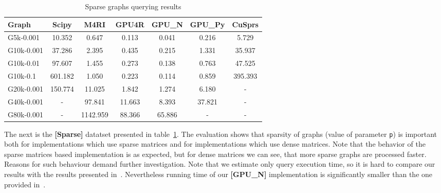 {\setlength{\tabcolsep}{0.25em}
\begin{table}[H]
\caption{Sparse graphs querying results}
\label{tbl:tableSparse}
\begin{tabular}{| l | c | c | c | c | c | c | }
    \hline
    Graph              & Scipy   & M4RI     & GPU4R  & GPU\_N & GPU\_Py & CuSprs  \\
    \hline
    \hline
    \small{G5k-0.001}  & 10.352  & 0.647    & 0.113  & 0.041  & 0.216   & 5.729   \\
    \small{G10k-0.001} & 37.286  & 2.395    & 0.435  & 0.215  & 1.331   & 35.937  \\
    \small{G10k-0.01}  & 97.607  & 1.455    & 0.273  & 0.138  & 0.763   & 47.525  \\
    \small{G10k-0.1}   & 601.182 & 1.050    & 0.223  & 0.114  & 0.859   & 395.393 \\
    \small{G20k-0.001} & 150.774 & 11.025   & 1.842  & 1.274  & 6.180   & -       \\
    \small{G40k-0.001} & -       & 97.841   & 11.663 & 8.393  & 37.821  & -       \\
    \small{G80k-0.001} & -       & 1142.959 & 88.366 & 65.886 & -       & -       \\
    \hline
  \end{tabular}
\end{table}
}

The next is the \textbf{[Sparse]} datatset presented in table~\ref{tbl:tableSparse}.
The evaluation shows that sparsity of graphs (value of parameter \texttt{p}) is important both for implementations which use sparse matrices and for implementations which use dense matrices.
Note that the behavior of the sparse matrices based implementation is as expected, but for dense matrices we can see, that more sparse graphs are processed faster.
Reasons for such behaviour demand further investigation.
Note that we estimate only query execution time, so it is hard to compare our results with the results presented in~\cite{fan2018scaling}.
Nevertheless running time of our \textbf{[GPU\_N]} implementation is significantly smaller than the one provided in~\cite{fan2018scaling}.

